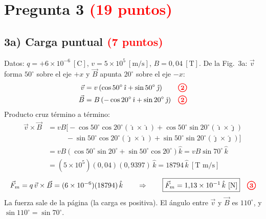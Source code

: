 \documentclass[12pt,letterpaper]{article}
\newcommand{\pts}[1]{\tikz[baseline=(c.base)]\node[circle,draw=red,text=red,thick,inner sep=1.3pt,font=\small\bfseries](c){#1};}
\begin{document}
\newpage
\section*{Pregunta 3 \quad\textcolor{red}{(19 puntos)}}

\begin{center}
\end{center}

\subsection*{3a) Carga puntual \quad\textcolor{red}{(7 puntos)}}

Datos: $q = +6\times10^{-6}\ [\text{C}]$, $v = 5\times10^{5}\ [\text{m/s}]$, $B = 0{,}04\ [\text{T}]$.
De la Fig.~3a: $\vec{v}$ forma $50^\circ$ sobre el eje $+x$ y $\vec{B}$ apunta $20^\circ$ sobre el eje $-x$:
\begin{align*}
    \vec{v} &= v\left(\cos50^\circ\,\hat{\imath} + \sin50^\circ\,\hat{\jmath}\right) && \pts{2}\\
    \vec{B} &= B\left(-\cos20^\circ\,\hat{\imath} + \sin20^\circ\,\hat{\jmath}\right) && \pts{2}
\end{align*}
Producto cruz t\'ermino a t\'ermino:
\begin{align*}
    \vec{v}\times\vec{B}
      &= vB\bigl[-\cos50^\circ\cos20^\circ(\hat{\imath}\times\hat{\imath})
         + \cos50^\circ\sin20^\circ(\hat{\imath}\times\hat{\jmath})\\
      &\qquad\;\; - \sin50^\circ\cos20^\circ(\hat{\jmath}\times\hat{\imath})
         + \sin50^\circ\sin20^\circ(\hat{\jmath}\times\hat{\jmath})\bigr]\\
      &= vB\left(\cos50^\circ\sin20^\circ + \sin50^\circ\cos20^\circ\right)\hat{k}
       = vB\sin70^\circ\,\hat{k}\\
      &= (5\times10^{5})(0{,}04)(0{,}9397)\,\hat{k} = 18794\,\hat{k}\ [\text{T m/s}]
\end{align*}
\[
    \vec{F}_m = q\,\vec{v}\times\vec{B} = (6\times10^{-6})(18794)\,\hat{k}
    \qquad\Rightarrow\qquad
    \boxed{\vec{F}_m = 1{,}13\times10^{-1}\,\hat{k}\ [\text{N}]} \quad\pts{3}
\]
La fuerza sale de la p\'agina (la carga es positiva). El \'angulo entre $\vec{v}$ y $\vec{B}$ es
$110^\circ$, y $\sin110^\circ = \sin70^\circ$.
\end{document}
